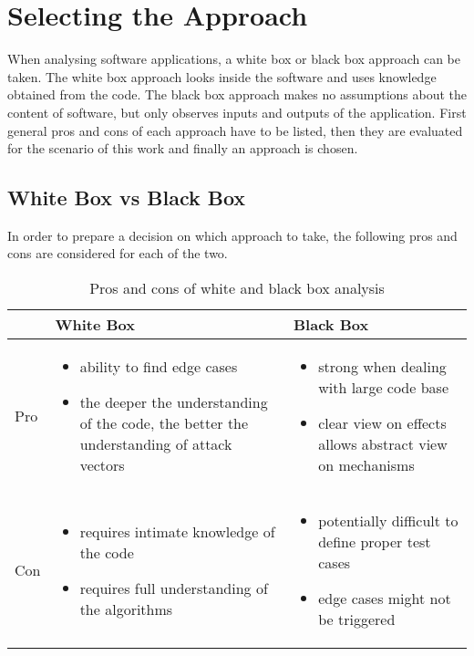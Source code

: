 \section{Selecting the Approach} \label{section:luckypatcher-analysis}
When analysing software applications, a white box or black box approach can be taken.
The white box approach looks inside the software and uses knowledge obtained from the code.
The black box approach makes no assumptions about the content of software, but only observes inputs and outputs of the application.
\newline
First general pros and cons of each approach have to be listed, then they are evaluated for the scenario of this work and finally an approach is chosen.
\subsection{White Box vs Black Box}
In order to prepare a decision on which approach to take, the following pros and cons are considered for each of the two.
\begin{table}
  \centering
\begin{tabular}[]
  {|l|p{}|p{}|}
  \hline
   & White Box & Black Box \\ \hline
  Pro &
  \begin{itemize}
    \item ability to find edge cases
    \item the deeper the understanding of the code, the better the understanding of attack vectors
  \end{itemize} & \begin{itemize}
    \item strong when dealing with large code base
    \item clear view on effects allows abstract view on mechanisms
  \end{itemize} \\ \hline
  Con&
  \begin{itemize}
    \item requires intimate knowledge of the code
    \item requires full understanding of the algorithms
  \end{itemize} & \begin{itemize}
    \item potentially difficult to define proper test cases
    \item edge cases might not be triggered
  \end{itemize} \\ \hline
\end{tabular}
\caption{Pros and cons of white and black box analysis}
\label{my-label}
\end{table}

